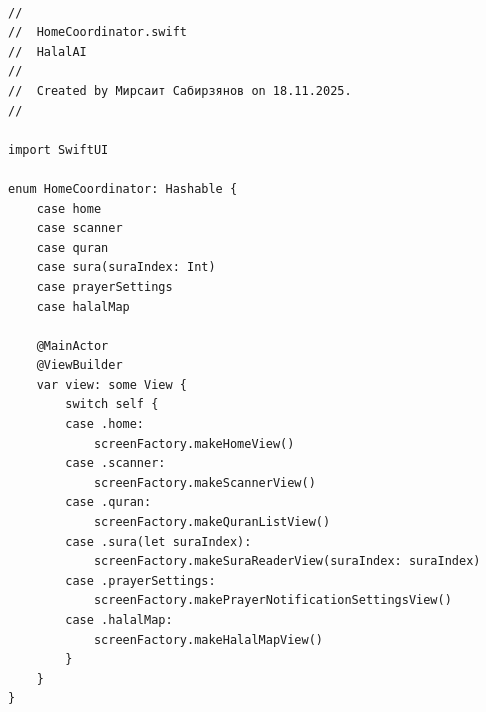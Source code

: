 \begin{lstlisting}[basicstyle=\tiny\ttfamily,breaklines=true]

//
//  HomeCoordinator.swift
//  HalalAI
//
//  Created by Мирсаит Сабирзянов on 18.11.2025.
//

import SwiftUI

enum HomeCoordinator: Hashable {
    case home
    case scanner
    case quran
    case sura(suraIndex: Int)
    case prayerSettings
    case halalMap

    @MainActor
    @ViewBuilder
    var view: some View {
        switch self {
        case .home:
            screenFactory.makeHomeView()
        case .scanner:
            screenFactory.makeScannerView()
        case .quran:
            screenFactory.makeQuranListView()
        case .sura(let suraIndex):
            screenFactory.makeSuraReaderView(suraIndex: suraIndex)
        case .prayerSettings:
            screenFactory.makePrayerNotificationSettingsView()
        case .halalMap:
            screenFactory.makeHalalMapView()
        }
    }
}
\end{lstlisting}


